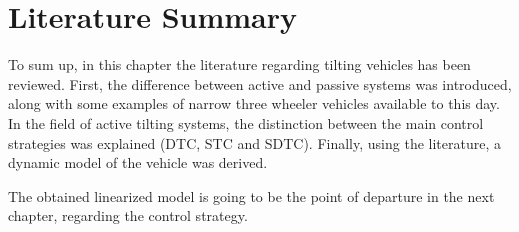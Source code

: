 \section{Literature Summary}

To sum up, in this chapter the literature regarding tilting vehicles has been reviewed. First, the  difference between active and passive systems was introduced, along with some examples of narrow three wheeler vehicles available to this day. In the field of active tilting systems, the distinction between the main control strategies was explained (DTC, STC and SDTC). Finally, using the literature, a dynamic model of the vehicle was derived.

The obtained linearized model is going to be the point of departure in the next chapter, regarding the control strategy.



